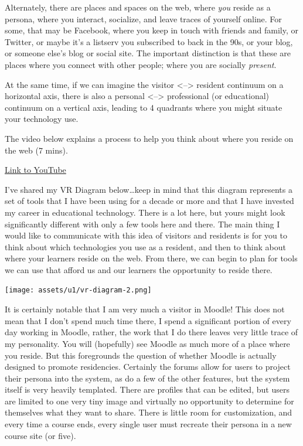 \documentclass[
]{book}
\theoremstyle{definition}
\theoremstyle{definition}
\theoremstyle{definition}
\theoremstyle{definition}
\theoremstyle{remark}
\begin{document}
Alternately, there are places and spaces on the web, where \emph{you} reside as a persona, where you interact, socialize, and leave traces of yourself online. For some, that may be Facebook, where you keep in touch with friends and family, or Twitter, or maybe it's a listserv you subscribed to back in the 90s, or your blog, or someone else's blog or social site. The important distinction is that these are places where you connect with other people; where you are socially \emph{present}.

At the same time, if we can imagine the visitor \textless--\textgreater{} resident continuum on a horizontal axis, there is also a personal \textless--\textgreater{} professional (or educational) continuum on a vertical axis, leading to 4 quadrants where you might situate your technology use.

The video below explains a process to help you think about where you reside on the web (7 mins).

\href{https://www.youtube.com/watch?v=sPOG3iThmRI}{Link to YouTube}

I've shared my VR Diagram below\ldots keep in mind that this diagram represents a set of tools that I have been using for a decade or more and that I have invested my career in educational technology. There is a lot here, but yours might look significantly different with only a few tools here and there. The main thing I would like to communicate with this idea of visitors and residents is for you to think about which technologies you use as a resident, and then to think about where your learners reside on the web. From there, we can begin to plan for tools we can use that afford us and our learners the opportunity to reside there.

\texttt{[image: assets/u1/vr-diagram-2.png]}

It is certainly notable that I am very much a visitor in Moodle! This does not mean that I don't spend much time there, I spend a significant portion of every day working in Moodle, rather, the work that I do there leaves very little trace of my personality. You will (hopefully) see Moodle as much more of a place where you reside. But this foregrounds the question of whether Moodle is actually designed to promote residencies. Certainly the forums allow for users to project their persona into the system, as do a few of the other features, but the system itself is very heavily templated. There are profiles that can be edited, but users are limited to one very tiny image and virtually no opportunity to determine for themselves what they want to share. There is little room for customization, and every time a course ends, every single user must recreate their persona in a new course site (or five).
\end{document}
